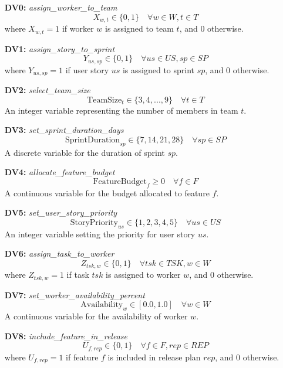 \documentclass[a4paper, 11pt]{article}
\begin{document}
\begin{itemize}
    \item[\textbf{DV0:}] \textit{assign\_worker\_to\_team}
    $$ X_{w,t} \in \{0, 1\} \quad \forall w \in W, t \in T $$
    where $X_{w,t} = 1$ if worker $w$ is assigned to team $t$, and 0 otherwise.

    \item[\textbf{DV1:}] \textit{assign\_story\_to\_sprint}
    $$ Y_{us,sp} \in \{0, 1\} \quad \forall us \in US, sp \in SP $$
    where $Y_{us,sp} = 1$ if user story $us$ is assigned to sprint $sp$, and 0 otherwise.

    \item[\textbf{DV2:}] \textit{select\_team\_size}
    $$ \text{TeamSize}_{t} \in \{3, 4, ..., 9\} \quad \forall t \in T $$
    An integer variable representing the number of members in team $t$.

    \item[\textbf{DV3:}] \textit{set\_sprint\_duration\_days}
    $$ \text{SprintDuration}_{sp} \in \{7, 14, 21, 28\} \quad \forall sp \in SP $$
    A discrete variable for the duration of sprint $sp$.

    \item[\textbf{DV4:}] \textit{allocate\_feature\_budget}
    $$ \text{FeatureBudget}_{f} \ge 0 \quad \forall f \in F $$
    A continuous variable for the budget allocated to feature $f$.

    \item[\textbf{DV5:}] \textit{set\_user\_story\_priority}
    $$ \text{StoryPriority}_{us} \in \{1, 2, 3, 4, 5\} \quad \forall us \in US $$
    An integer variable setting the priority for user story $us$.

    \item[\textbf{DV6:}] \textit{assign\_task\_to\_worker}
    $$ Z_{tsk,w} \in \{0, 1\} \quad \forall tsk \in TSK, w \in W $$
    where $Z_{tsk,w} = 1$ if task $tsk$ is assigned to worker $w$, and 0 otherwise.

    \item[\textbf{DV7:}] \textit{set\_worker\_availability\_percent}
    $$ \text{Availability}_w \in [0.0, 1.0] \quad \forall w \in W $$
    A continuous variable for the availability of worker $w$.

    \item[\textbf{DV8:}] \textit{include\_feature\_in\_release}
    $$ U_{f,rep} \in \{0, 1\} \quad \forall f \in F, rep \in REP $$
    where $U_{f,rep} = 1$ if feature $f$ is included in release plan $rep$, and 0 otherwise.
\end{itemize}
\end{document}
